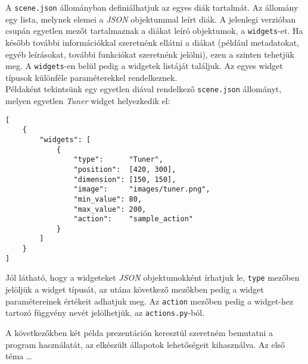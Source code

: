 A \texttt{scene.json} állományban definiálhatjuk az egyes diák tartalmát. Az állomány egy lista, melynek elemei a \textit{JSON} objektummal leírt diák. A jelenlegi verzióban csupán egyetlen mezőt tartalmaznak a diákat leíró objektumok, a \texttt{widgets}-et. Ha később további információkkal szeretnénk ellátni a diákat (például metadatokat, egyéb leírásokat, további funkciókat szeretnénk jelölni), ezen a szinten tehetjük meg. A \texttt{widgets}-en belül pedig a widgetek listáját találjuk. Az egyes widget típusok különféle paraméterekkel rendelkeznek.\\
Példaként tekintsünk egy egyetlen diával rendelkező \texttt{scene.json} állományt, melyen egyetlen \textit{Tuner} widget helyezkedik el:
\begin{verbatim}
[
    {
        "widgets": [
            {
                "type":      "Tuner",
                "position":  [420, 300],
                "dimension": [150, 150],
                "image":     "images/tuner.png",
                "min_value": 80,
                "max_value": 200,
                "action":    "sample_action"
            }
        ]
    }
]
\end{verbatim}
Jól látható, hogy a widgeteket \textit{JSON} objektumokként írhatjuk le, \texttt{type} mezőben jelöljük a widget típusát, az utána következő mezőkben pedig a widget paramétereinek értékeit adhatjuk meg. Az \texttt{action} mezőben pedig a widget-hez tartozó függvény nevét jelölhetjük, az \texttt{actions.py}-ból.

A következőkben két példa prezentáción keresztül szeretném bemutatni a program használatát, az elkészült állapotok lehetőségeit kihasználva. Az első téma \ldots



